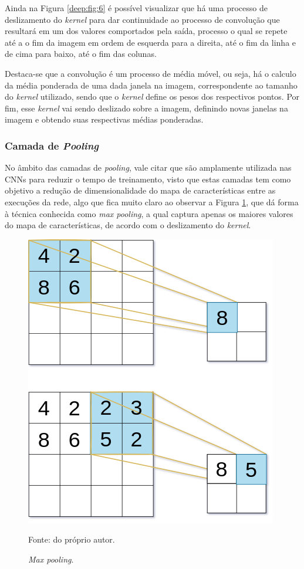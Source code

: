 Ainda na Figura \ref{deep:fig:6} é possível visualizar que há uma processo de deslizamento do \textit{kernel} para dar continuidade ao processo de convolução que resultará em um dos valores comportados pela saída, processo o qual se repete até a o fim da imagem em ordem de esquerda para a direita, até o fim da linha e de cima para baixo, até o fim das colunas.

Destaca-se que a convolução é um processo de média móvel, ou seja, há o calculo da média ponderada de uma dada janela na imagem, correspondente ao tamanho do \textit{kernel} utilizado, sendo que o \textit{kernel} define os pesos dos respectivos pontos. Por fim, esse \textit{kernel} vai sendo deslizado sobre a imagem, definindo novas janelas na imagem e obtendo suas respectivas médias ponderadas.


\subsubsection{Camada de \textit{Pooling}}
\label{deep:pooling}

No âmbito das camadas de \textit{pooling}, vale citar que são amplamente utilizada nas CNNs para reduzir o tempo de treinamento, visto que estas camadas tem como objetivo a redução de dimensionalidade do mapa de características entre as execuções da rede, algo que fica muito claro ao observar a Figura \ref{deep:fig:7}, que dá forma à técnica conhecida como \textit{max pooling}, a qual captura apenas os maiores valores do mapa de características, de acordo com o deslizamento do \textit{kernel}.

\begin{figure}[H]
    \centering
    \caption{\textit{Max pooling}.}
    \includegraphics[width=0.5\linewidth]{recursos/imagens/deep/max_pooling.png}
    \label{deep:fig:7}
    
    \vspace*{1 cm}
    Fonte: do próprio autor.
\end{figure}

